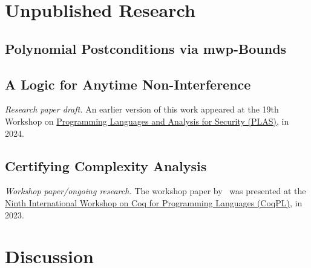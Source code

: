 \chapter{Unpublished Research}\label{ch:unpublished-research}

    \section{Polynomial Postconditions via mwp-Bounds}\label{sec:postcond}
    \pageIconFm
    \clearpage
    
    \clearpage

    \section{A Logic for Anytime Non-Interference}\label{sec:anytime}
    \pageIconSecurity
    {\emph{Research paper draft.}
    \newline\newline{}An earlier version of this work appeared at the 19th Workshop on
    \href{https://plas24.github.io/}
    {Programming Languages and Analysis for Security (PLAS)}, in 2024.}
    \clearpage
    {}
    \clearpage

    \section{Certifying Complexity Analysis}\label{sec:mwp-calc-formal}
    \pageIconFm
    {\emph{Workshop paper/ongoing research.}
    \newline\newline{}The workshop paper by~ was presented at the
    \href{https://popl23.sigplan.org/home/CoqPL-2023} {Ninth International
    Workshop on Coq for Programming Languages (CoqPL)}, in 2023.}
    \clearpage
    
    \clearpage

\chapter{Discussion}\label{ch:discussion}


